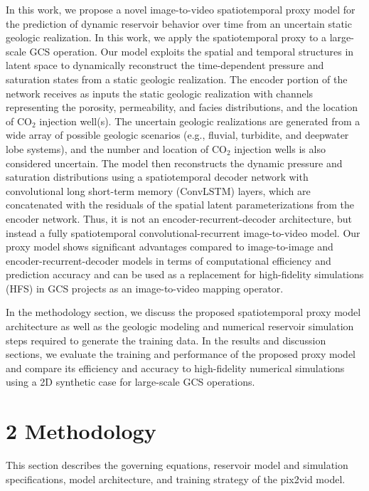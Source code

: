 \documentclass[10pt, twoside]{article}
\begin{document}
In this work, we propose a novel image-to-video spatiotemporal proxy model for the prediction of dynamic reservoir behavior over time from an uncertain static geologic realization. In this work, we apply the spatiotemporal proxy to a large-scale GCS operation. Our model exploits the spatial and temporal structures in latent space to dynamically reconstruct the time-dependent pressure and saturation states from a static geologic realization. The encoder portion of the network receives as inputs the static geologic realization with channels representing the porosity, permeability, and facies distributions, and the location of CO$_2$ injection well(s). The uncertain geologic realizations are generated from a wide array of possible geologic scenarios (e.g., fluvial, turbidite, and deepwater lobe systems), and the number and location of CO$_2$ injection wells is also considered uncertain. The model then reconstructs the dynamic pressure and saturation distributions using a spatiotemporal decoder network with convolutional long short-term memory (ConvLSTM) layers, which are concatenated with the residuals of the spatial latent parameterizations from the encoder network. Thus, it is not an encoder-recurrent-decoder architecture, but instead a fully spatiotemporal convolutional-recurrent image-to-video model. Our proxy model shows significant advantages compared to image-to-image and encoder-recurrent-decoder models in terms of computational efficiency and prediction accuracy and can be used as a replacement for high-fidelity simulations (HFS) in GCS projects as an image-to-video mapping operator. 

In the methodology section, we discuss the proposed spatiotemporal proxy model architecture as well as the geologic modeling and numerical reservoir simulation steps required to generate the training data. In the results and discussion sections, we evaluate the training and performance of the proposed proxy model and compare its efficiency and accuracy to high-fidelity numerical simulations using a 2D synthetic case for large-scale GCS operations. 

\section*{\textbf{2 Methodology}}
This section describes the governing equations, reservoir model and simulation specifications, model architecture, and training strategy of the pix2vid model.
\end{document}
